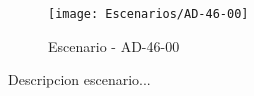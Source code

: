 \begin{figure}[H]
\centering
\texttt{[image: Escenarios/AD-46-00]}
\caption{Escenario - AD-46-00}
\label{fig:AD-46-00}
\end{figure}

Descripcion escenario...
\clearpage
